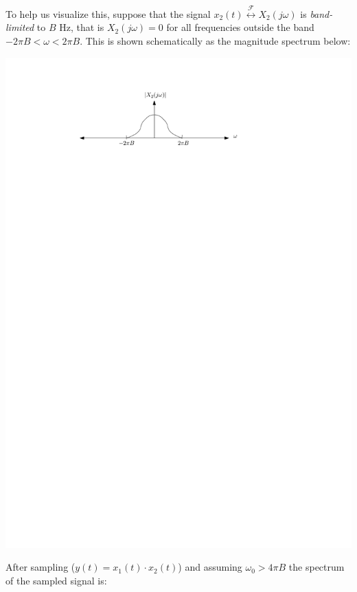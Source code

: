 To help us visualize this, suppose that the signal $x_2(t)  \stackrel{\mathcal{F}}{\longleftrightarrow} X_2(j\omega)$ is \emph{band-limited} to $B$ Hz, that is $X_2(j\omega) = 0$ for all frequencies outside the band $-2\pi B < \omega < 2\pi B$. This is shown schematically as the magnitude spectrum below:

\begin{center}
  \includegraphics[scale=1]{graphics/bandlimited.pdf}
\end{center}
After sampling ($y(t) = x_1(t)\cdot x_2(t)$) and assuming $\omega_0 > 4\pi B$ the spectrum of the sampled signal is:
